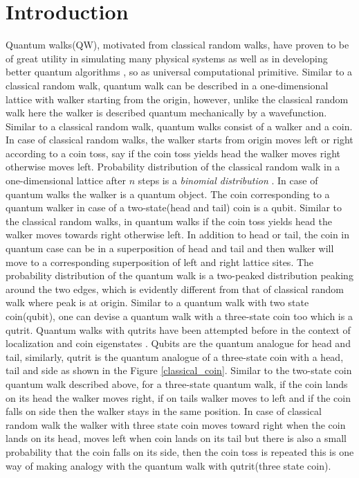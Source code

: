 \documentclass[english,aps,pra,amsmath,amssymb,showpacs,notitlepage,onecolumn]{revtex4-1}
\begin{document}
\section{Introduction}
Quantum walks(QW), motivated from classical random walks, have proven to be of great utility in simulating many physical systems \cite{two_particle,Marquez-Martin2016} as well as in developing better quantum algorithms \cite{algo,qcomp1,qcomp2}, so as universal computational primitive\cite{universal}. Similar to a classical random walk, quantum walk can be described in a one-dimensional lattice with walker starting from the origin, however, unlike the classical random walk here the walker is described quantum mechanically by a wavefunction. Similar to a classical random walk, quantum walks consist of a walker and a coin. In case of classical random walks, the walker starts from origin moves left or right according to a coin toss, say if the coin toss yields head the walker moves right otherwise moves left. Probability distribution of the classical random walk in a one-dimensional lattice after $n$ steps is a \textit{binomial distribution} \cite{classical}. In case of quantum walks the walker is a quantum object. The coin corresponding to a quantum walker in case of a two-state(head and tail) coin is a qubit. Similar to the classical random walks, in quantum walks if the coin toss yields head the walker moves towards right otherwise left. In addition to head or tail, the coin in quantum case can be in a superposition of head and tail and then walker will move to a corresponding superposition of left and right lattice sites. The probability distribution of the quantum walk is a two-peaked distribution peaking around the two edges, which is evidently different from that of classical random walk where peak is at origin\cite{Andraca}. Similar to a quantum walk with two state coin(qubit), one can devise a quantum walk with a three-state coin too which is a qutrit. Quantum walks with qutrits have been attempted before in the context of localization \cite{qutrit1}and coin eigenstates\cite{qutrit2} . Qubits are the quantum analogue for head and tail, similarly, qutrit is the quantum analogue of a three-state coin with a head, tail and side as shown in the Figure \ref{classical_coin}. Similar to the two-state coin quantum walk described above, for a three-state quantum walk, if the coin lands on its head the walker moves right, if on tails walker moves to left and if the coin falls on side then the walker stays in the same position. In case of classical random walk the walker with three state coin moves toward right when the coin lands on its head, moves left when coin lands on its tail but there is also a small probability that the coin falls on its side, then the coin toss is repeated this is one way of making analogy with the quantum walk with qutrit(three state coin).\\
\end{document}
